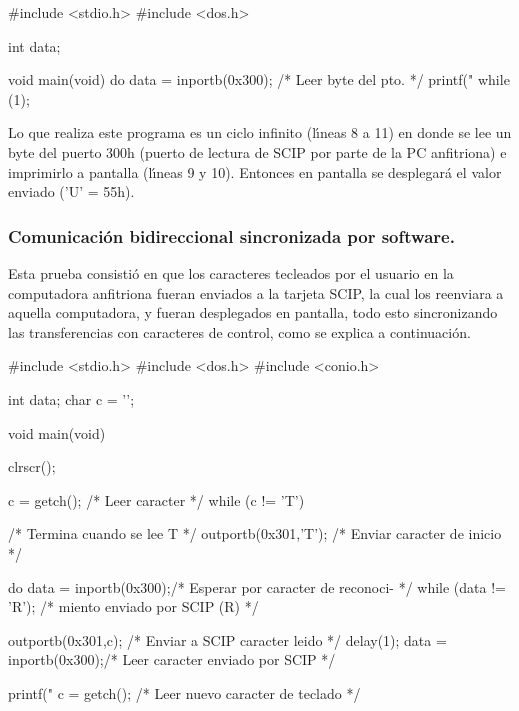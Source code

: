 \begin{listing}{1}
#include <stdio.h>
#include <dos.h>

int data;

void main(void) 
{ 
    do {
       data = inportb(0x300);  /* Leer byte del pto. */
       printf("%
   } while (1);
}
\end{listing}

Lo que realiza este programa es un ciclo infinito (l\'{\i}neas 8 a 11) en donde se lee un byte %
del puerto 300h (puerto de lectura de SCIP por parte de la PC anfitriona) e imprimirlo a %
pantalla (l\'{\i}neas 9 y 10). Entonces en pantalla se desplegar\'a el valor enviado ('U' = %
55h).


\subsubsection{Comunicaci\'on bidireccional sincronizada por software.}
\label{Subsubsection:prueba2}

Esta prueba consisti\'o en que los caracteres tecleados por el usuario en la computadora %
anfitriona fueran enviados a la tarjeta SCIP, la cual los reenviara a aquella computadora, y %
fueran desplegados en pantalla, todo esto sincronizando las transferencias con caracteres de %
control, como se explica a continuaci\'on.

\begin{listing}{1}
#include <stdio.h>
#include <dos.h>
#include <conio.h>

int data;
char c = '\0';

void main(void)
{
   clrscr();

   c = getch();             /* Leer caracter */
   while (c != 'T') {       /* Termina cuando se lee T */
      outportb(0x301,'T');  /* Enviar caracter de inicio */

      do {                        
         data = inportb(0x300);/* Esperar por caracter de reconoci- */
     } while (data != 'R'); /* miento enviado por SCIP (R) */


      outportb(0x301,c);    /* Enviar a SCIP caracter leido */
      delay(1);       
      data = inportb(0x300);/* Leer caracter enviado por SCIP */

      printf("%
      c = getch();          /* Leer nuevo caracter de teclado */
   }
}
\end{listing}

